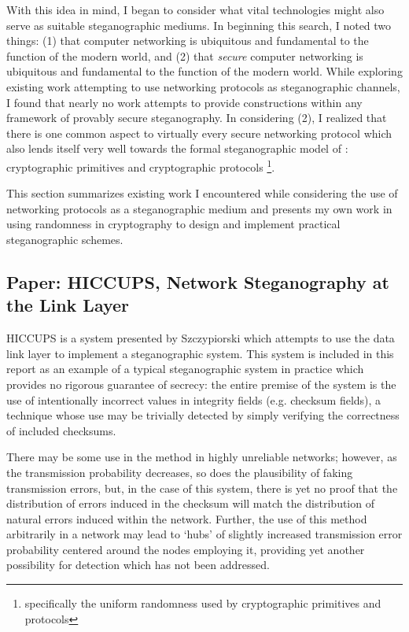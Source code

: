 \documentclass{article}
\begin{document}
With this idea in mind, I began to consider what vital technologies might 
also serve as suitable steganographic mediums.  In beginning this search, I noted two things: (1) that 
computer networking is ubiquitous and fundamental to the function of the modern world, and (2) that 
\textit{secure} computer networking is ubiquitous and fundamental to the function of the modern world.
While exploring existing work attempting to use networking protocols as steganographic channels, I found 
that nearly no work attempts to provide constructions within any framework of provably secure steganography.
In considering (2), I realized that there is one common aspect to virtually every secure networking protocol
which also lends itself very well towards the formal steganographic model of \cite{BiglouPSS}: cryptographic primitives 
and cryptographic protocols \footnote{specifically the uniform randomness used by cryptographic primitives and protocols}.

This section summarizes existing work I encountered while considering the use of networking protocols 
as a steganographic medium and presents my own work in using randomness in cryptography to design and implement 
practical steganographic schemes.

\subsection{Paper: HICCUPS, Network Steganography at the Link Layer}

HICCUPS is a system presented by Szczypiorski \cite{HICCUPS} which attempts to use the data link layer to implement a 
steganographic system.  This system is included in this report as an example of a typical steganographic system in practice which 
provides no rigorous guarantee of secrecy: the entire premise of the system is the use of intentionally incorrect values in 
integrity fields (e.g. checksum fields), a technique whose use may be trivially detected by simply verifying the correctness of 
included checksums.

There may be some use in the method in highly unreliable networks; however, as the transmission probability decreases,
so does the plausibility of faking transmission errors, but, in the case of this system, there is yet no proof that the distribution 
of errors induced in the checksum will match the distribution of natural errors induced within the network.  Further, the use of this 
method arbitrarily in a network may lead to `hubs' of slightly increased transmission error probability centered around the nodes employing it, 
providing yet another possibility for detection which has not been addressed.
\end{document}
